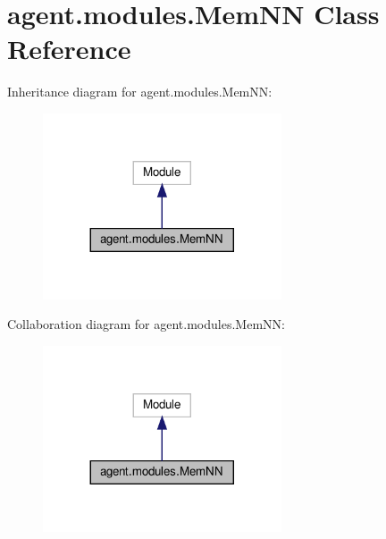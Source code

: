 \hypertarget{classagent_1_1modules_1_1MemNN}{}\section{agent.\+modules.\+Mem\+NN Class Reference}
\label{classagent_1_1modules_1_1MemNN}


Inheritance diagram for agent.\+modules.\+Mem\+NN\+:
\nopagebreak
\begin{figure}[H]
\begin{center}
\leavevmode
\includegraphics[width=200pt]{classagent_1_1modules_1_1MemNN__inherit__graph}
\end{center}
\end{figure}


Collaboration diagram for agent.\+modules.\+Mem\+NN\+:
\nopagebreak
\begin{figure}[H]
\begin{center}
\leavevmode
\includegraphics[width=200pt]{classagent_1_1modules_1_1MemNN__coll__graph}
\end{center}
\end{figure}
